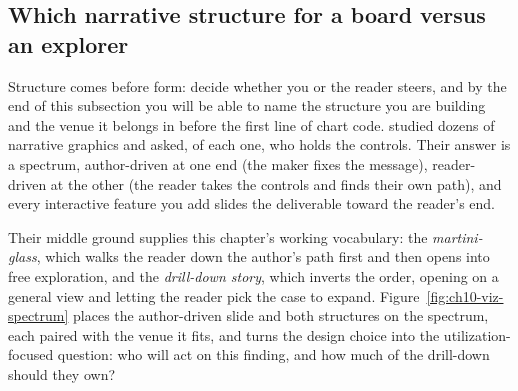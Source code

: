 \subsection{Which narrative structure for a board versus an explorer}\label{ch10-sec:structures}
Structure comes before form: decide whether you or the reader steers, and by the end of this subsection you will be able to name the structure you are building and the venue it belongs in before the first line of chart code. \textcite{segel2010narrative} studied dozens of narrative graphics and asked, of each one, who holds the controls. Their answer is a spectrum, author-driven at one end (the maker fixes the message), reader-driven at the other (the reader takes the controls and finds their own path), and every interactive feature you add slides the deliverable toward the reader's end.

Their middle ground supplies this chapter's working vocabulary: the \emph{martini-glass}, which walks the reader down the author's path first and then opens into free exploration, and the \emph{drill-down story}, which inverts the order, opening on a general view and letting the reader pick the case to expand. Figure~\ref{fig:ch10-viz-spectrum} places the author-driven slide and both structures on the spectrum, each paired with the venue it fits, and turns the design choice into the utilization-focused question: who will act on this finding, and how much of the drill-down should they own?

